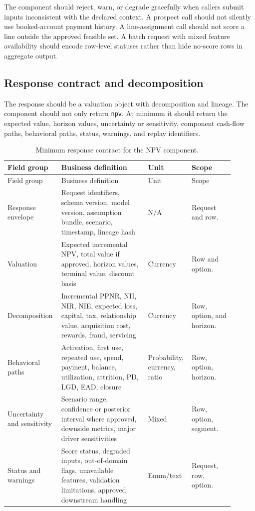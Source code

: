 \documentclass[11pt]{article}
\newcommand{\1}{\mathbf{1}}
\newcommand{\code}[1]{\nolinkurl{#1}}
\begin{document}
The component should reject, warn, or degrade gracefully when callers submit
inputs inconsistent with the declared context. A prospect call should not
silently use booked-account payment history. A line-assignment call should not
score a line outside the approved feasible set. A batch request with mixed
feature availability should encode row-level statuses rather than hide no-score
rows in aggregate output.

\subsection{Response contract and decomposition}
\label{subsec:response-contract}

The response should be a valuation object with decomposition and lineage. The
component should not only return \code{npv}. At minimum it should return the
expected value, horizon values, uncertainty or sensitivity, component
cash-flow paths, behavioral paths, status, warnings, and replay identifiers.

\begin{longtable}{L{0.21\linewidth}L{0.37\linewidth}L{0.14\linewidth}L{0.18\linewidth}}
\caption{Minimum response contract for the NPV component.}
\label{tab:response-contract}\\
\toprule
Field group & Business definition & Unit & Scope \\
\midrule
\endfirsthead
\toprule
Field group & Business definition & Unit & Scope \\
\midrule
\endhead
Response envelope
  & Request identifiers, schema version, model version, assumption bundle,
    scenario, timestamp, lineage hash
  & N/A
  & Request and row. \\
Valuation
  & Expected incremental NPV, total value if approved, horizon values,
    terminal value, discount basis
  & Currency
  & Row and option. \\
Decomposition
  & Incremental PPNR, NII, NIR, NIE, expected loss, capital, tax, relationship
    value, acquisition cost, rewards, fraud, servicing
  & Currency
  & Row, option, and horizon. \\
Behavioral paths
  & Activation, first use, repeated use, spend, payment, balance, utilization,
    attrition, PD, LGD, EAD, closure
  & Probability, currency, ratio
  & Row, option, horizon. \\
Uncertainty and sensitivity
  & Scenario range, confidence or posterior interval where approved, downside
    metrics, major driver sensitivities
  & Mixed
  & Row, option, segment. \\
Status and warnings
  & Score status, degraded inputs, out-of-domain flags, unavailable features,
    validation limitations, approved downstream handling
  & Enum/text
  & Request, row, option. \\
\bottomrule
\end{longtable}
\end{document}
